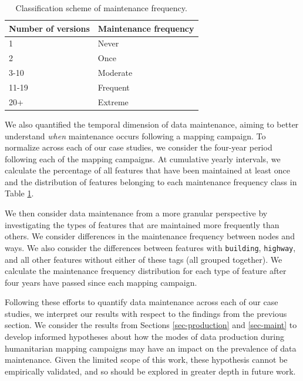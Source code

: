 \begin{table}[]
\centering
\caption{Classification scheme of maintenance frequency.}
\label{tab:freq}
\begin{tabular}{ll}
\toprule
Number of versions & Maintenance frequency \\
\midrule
1                  & Never                  \\
2                  & Once                  \\
3-10               & Moderate              \\
11-19              & Frequent              \\
20+                & Extreme               \\
\bottomrule
\end{tabular}
\end{table}

We also quantified the temporal dimension of data maintenance, aiming to better understand \textit{when} maintenance occurs following a mapping campaign. To normalize across each of our case studies, we consider the four-year period following each of the mapping campaigns. At cumulative yearly intervals, we calculate the percentage of all features that have been maintained at least once and the distribution of features belonging to each maintenance frequency class in Table \ref{tab:freq}. 

We then consider data maintenance from a more granular perspective by investigating the types of features that are maintained more frequently than others. We consider differences in the maintenance frequency between nodes and ways. We also consider the differences between features with \texttt{building}, \texttt{highway}, and all other features without either of these tags (all grouped together). We calculate the maintenance frequency distribution for each type of feature after four years have passed since each mapping campaign. 

Following these efforts to quantify data maintenance across each of our case studies, we interpret our results with respect to the findings from the previous section. We consider the results from Sections \ref{sec-production} and \ref{sec-maint} to develop informed hypotheses about how the modes of data production during humanitarian mapping campaigns may have an impact on the prevalence of data maintenance. Given the limited scope of this work, these hypothesis cannot be empirically validated, and so should be explored in greater depth in future work. 

